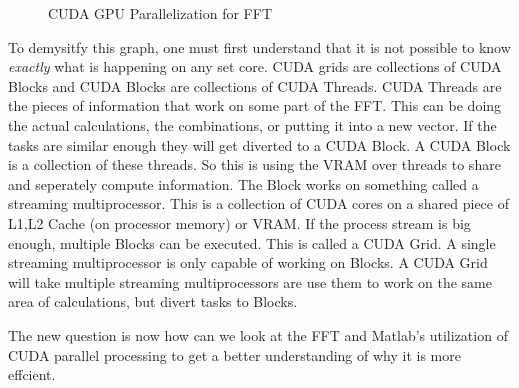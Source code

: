 \documentclass{article}
\begin{document}
    \begin{figure}[h]
    \centering
        \caption{CUDA GPU Parallelization for FFT}
    \end{figure}
    \begin{sloppypar}
        \indent{}To demysitfy this graph, one must first understand that it is not possible to know \emph{exactly} what is happening on any set core. CUDA grids are collections of CUDA Blocks and CUDA Blocks are collections of CUDA Threads. CUDA Threads
        are the pieces of information that work on some part of the FFT. This can be doing the actual calculations, the combinations, or putting it into a new vector. If the tasks are similar enough they will get diverted to a CUDA Block. A CUDA Block is a collection of these threads. So this is 
        using the VRAM over threads to share and seperately compute information. The Block works on something called a streaming multiprocessor. This is a collection of CUDA cores on a shared piece of L1,L2 Cache (on processor memory) or VRAM. If the process stream is big enough, multiple Blocks can be executed.
        This is called a CUDA Grid. A single streaming multiprocessor is only capable of working on Blocks. A CUDA Grid will take multiple streaming multiprocessors are use them to work on the same area of calculations, but divert tasks to Blocks. \parencite{Gupta}
    \end{sloppypar}
    \begin{sloppypar}
        \indent{} The new question is now how can we look at the FFT and Matlab's utilization of CUDA parallel processing to get a better understanding of why it is more effcient.
    \end{sloppypar}
\end{document}
